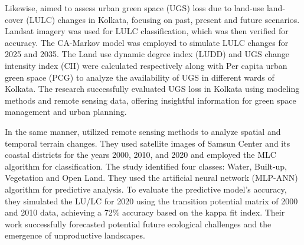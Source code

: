 Likewise,  aimed to assess urban green space (UGS) loss due to land-use land-cover (LULC) changes in Kolkata, focusing on past, present and future scenarios. Landsat imagery was used for LULC classification, which was then verified for accuracy. The CA-Markov model was employed to simulate LULC changes for 2025 and 2035. The Land use dynamic degree index (LUDD) and UGS change intensity index (CII) were calculated respectively along with  Per capita urban green space (PCG) to analyze the availability of UGS in different wards of Kolkata. The research successfully evaluated UGS loss in Kolkata using modeling methods and remote sensing data, offering insightful information for green space management and urban planning.

In the same manner,   utilized remote sensing methods to analyze spatial and temporal terrain changes. They used satellite images of Samsun Center and its coastal districts for the years 2000, 2010, and 2020 and employed the MLC algorithm for classification. The study identified four classes: Water, Built-up, Vegetation and Open Land. They used the artificial neural network (MLP-ANN) algorithm for predictive analysis. To evaluate the predictive model's accuracy, they simulated the LU/LC for 2020 using the transition potential matrix of 2000 and 2010 data, achieving a 72\% accuracy based on the kappa fit index.  Their work successfully forecasted potential future ecological challenges and the emergence of unproductive landscapes.








